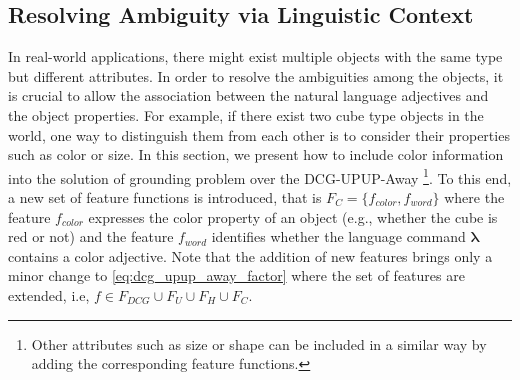 \subsection{Resolving Ambiguity via Linguistic Context}
\label{sec:color}
In real-world applications, there might exist multiple objects with the same type but different attributes. In order to resolve the ambiguities among the objects, it is crucial to allow the association between the natural language adjectives and the object properties. For example, if there exist two cube type objects in the world, one way to distinguish them from each other is to consider their properties such as color or size. In this section, we present how to include color information into the solution of grounding problem over the DCG-UPUP-Away \footnote{Other attributes such as size or shape can be included in a similar way by adding the corresponding feature functions.}. To this end, a new set of feature functions is introduced, that is $F_C = \{f_{color}, f_{word}\}$ where the feature $f_{color}$ expresses the color property of an object (e.g., whether the cube is red or not) and the feature $f_{word}$ identifies whether the language command $\boldsymbol\lambda$ contains a color adjective. Note that the addition of new features brings only a minor change to \eqref{eq:dcg_upup_away_factor} where the set of features are extended, i.e, $f \in F_{DCG} \cup F_U \cup F_H \cup F_C$. 


